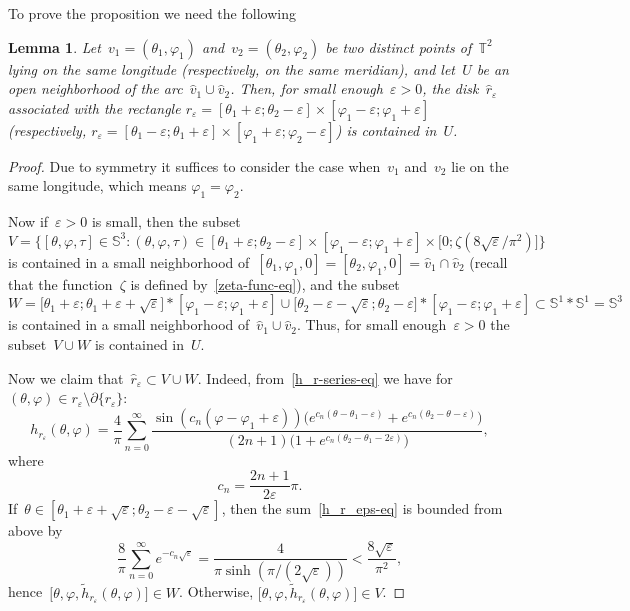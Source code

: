 \documentclass{amsart}
\theoremstyle{theorem}
\newtheorem{lemm}[theo]{Lemma}
\theoremstyle{remark}
\theoremstyle{definition}
\numberwithin{equation}{section}
\numberwithin{figure}{section}
\begin{document}
To prove the proposition we need the following
\begin{lemm}\label{lemm:neighborhood}
Let~$v_1=(\theta_1,\varphi_1)$ and~$v_2=(\theta_2,\varphi_2)$ be two distinct points of~$\mathbb T^2$
lying on the same longitude \emph(respectively, on the same meridian\emph), and let~$U$
be an open neighborhood of the arc~$\widehat v_1\cup\widehat v_2$.
Then, for small enough~$\varepsilon>0$,
the disk~$\widehat r_\varepsilon$ associated with the rectangle $r_\varepsilon=[\theta_1+\varepsilon;\theta_2-\varepsilon]\times[\varphi_1-\varepsilon;\varphi_1+\varepsilon]$
\emph(respectively, $r_\varepsilon= [\theta_1 - \varepsilon; \theta_1 + \varepsilon] \times[\varphi_1 + \varepsilon; \varphi_2 - \varepsilon]$\emph)
is contained in~$U$.
\end{lemm}
\begin{proof}
Due to symmetry it suffices to consider the case when~$v_1$ and~$v_2$ lie on the same longitude,
which means $\varphi_1 = \varphi_2$.


Now if~$\varepsilon>0$ is small, then the subset
$$V=\bigl\{[\theta,\varphi,\tau]\in\mathbb S^3:
(\theta,\varphi,\tau)\in[\theta_1 + \varepsilon; \theta_2 - \varepsilon]\times[\varphi_1 - \varepsilon; \varphi_1 + \varepsilon]\times\bigl[0; \zeta(8\sqrt\varepsilon/\pi^2)\bigr]\bigr\}$$
is contained in a small neighborhood of~$[\theta_1,\varphi_1,0]{}=[\theta_2,\varphi_1,0]=\widehat v_1\cap\widehat v_2$
(recall that the function~$\zeta$
is defined by~\eqref{zeta-func-eq}), and the subset
$$W=\bigl[\theta_1+\varepsilon; \theta_1 + \varepsilon + \sqrt\varepsilon\bigr]*[\varphi_1 - \varepsilon; \varphi_1 + \varepsilon] \cup
\bigl[\theta_2-\varepsilon - \sqrt\varepsilon; \theta_2 - \varepsilon\bigr]*[\varphi_1 - \varepsilon; \varphi_1 + \varepsilon]\subset\mathbb S^1*\mathbb S^1=
\mathbb S^3$$
is contained in a small neighborhood of~$\widehat v_1\cup\widehat v_2$.
Thus, for small enough~$\varepsilon>0$ the subset~$V\cup W$ is contained in~$U$.

Now we claim that~$\widehat r_\varepsilon\subset V\cup W$. Indeed, from~\eqref{h_r-series-eq} we have for~$(\theta,\varphi)\in r_\varepsilon\setminus\partial\{r_\varepsilon\}$:
\begin{equation}\label{h_r_eps-eq}
h_{r_\varepsilon}(\theta,\varphi)=\frac4\pi\sum_{n=0}^\infty
\frac{\sin(c_n(\varphi-\varphi_1+\varepsilon))\bigl(e^{c_n(\theta-\theta_1-\varepsilon)}+e^{c_n(\theta_2-\theta-\varepsilon)}\bigr)}
{(2n+1)\bigl(1+e^{c_n(\theta_2-\theta_1-2\varepsilon)}\bigr)},
\end{equation}
where
$$c_n=\frac{2n+1}{2\varepsilon}\pi.$$
If~$\theta\in[\theta_1+\varepsilon+\sqrt\varepsilon;\theta_2-\varepsilon-\sqrt\varepsilon]$, then the sum~\eqref{h_r_eps-eq}
is bounded from above by
$$\frac8\pi\sum_{n=0}^\infty e^{-c_n\sqrt\varepsilon}=\frac4{\pi\sinh(\pi/(2\sqrt\varepsilon))}<\frac{8\sqrt\varepsilon}{\pi^2},$$
hence~$\bigl[\theta,\varphi,\widetilde h_{r_\varepsilon}(\theta,\varphi)\bigr]\in W$. Otherwise,
$\bigl[\theta,\varphi,\widetilde h_{r_\varepsilon}(\theta,\varphi)\bigr]\in V$.
\end{proof}
\end{document}
